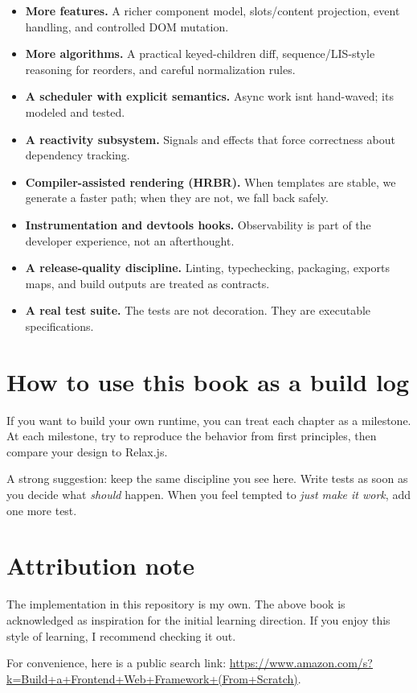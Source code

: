 \begin{itemize}
  \item \textbf{More features.} A richer component model, slots/content projection, event handling, and controlled DOM mutation.
  \item \textbf{More algorithms.} A practical keyed-children diff, sequence/LIS-style reasoning for reorders, and careful normalization rules.
  \item \textbf{A scheduler with explicit semantics.} Async work isn\textquotesingle t hand-waved; it\textquotesingle s modeled and tested.
  \item \textbf{A reactivity subsystem.} Signals and effects that force correctness about dependency tracking.
  \item \textbf{Compiler-assisted rendering (HRBR).} When templates are stable, we generate a faster path; when they are not, we fall back safely.
  \item \textbf{Instrumentation and devtools hooks.} Observability is part of the developer experience, not an afterthought.
  \item \textbf{A release-quality discipline.} Linting, typechecking, packaging, exports maps, and build outputs are treated as contracts.
  \item \textbf{A real test suite.} The tests are not decoration. They are executable specifications.
\end{itemize}

\section*{How to use this book as a build log}

If you want to build your own runtime, you can treat each chapter as a milestone.
At each milestone, try to reproduce the behavior from first principles, then compare your design to Relax\@.js.

A strong suggestion: keep the same discipline you see here.
Write tests as soon as you decide what \emph{should} happen.
When you feel tempted to \textit{just make it work}, add one more test.

\section*{Attribution note}

The implementation in this repository is my own.
The above book is acknowledged as inspiration for the initial learning direction.
If you enjoy this style of learning, I recommend checking it out.

For convenience, here is a public search link:
\href{https://www.amazon.com/s?k=Build+a+Frontend+Web+Framework+(From+Scratch)}{https://www.amazon.com/s?k=Build+a+Frontend+Web+Framework+(From+Scratch)}.

